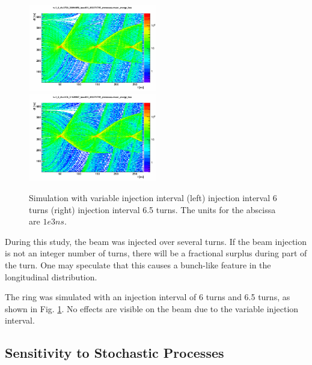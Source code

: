 \documentclass{paper}
\begin{document}
\begin{figure}
		\includegraphics[width=0.5\textwidth]{images/time_vs_dt_v=1_0_dt=3790_99964859_tau=631_833274765_processes=mean_energy_loss}
		\includegraphics[width=0.5\textwidth]{images/time_vs_dt_v=1_0_dt=4106_91628597_tau=631_833274765_processes=mean_energy_loss}
	\caption{Simulation with variable injection interval (left) injection interval
           6 turns (right) injection interval 6.5 turns. The units for the
           abscissa are $1e3 ns$.}
	\label{fig:mc_injection_interval}
\end{figure}

During this study, the beam was injected over several turns. If the beam 
injection is not an integer number of turns, there will be a fractional surplus
during part of the turn. One may speculate that this causes a bunch-like feature
in the longitudinal distribution.

The ring was simulated with an injection interval of 6 turns and 6.5 turns, as
shown in Fig. \ref{fig:mc_injection_interval}. No effects are visible on the 
beam due to the variable injection interval.

\subsection{Sensitivity to Stochastic Processes}
\end{document}
